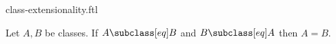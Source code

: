 \documentclass{article}
\begin{document}
\begin{smodule}[creators={Marcel Schütz}]{class-extensionality.ftl}

  \begin{faxiom*}[label=4436925823844352]
    Let $A, B$ be classes.
    If $A \subclass[eq] B$ and $B \subclass[eq] A$ then $A = B$.
  \end{faxiom*}
\end{smodule}
\end{document}
